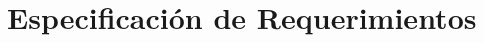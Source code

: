 \documentclass[a4paper]{report}
\begin{document}
\sffamily




\tableofcontents
\listoffigures
\listoftables
\pagebreak

\chapter{Especificación de Requerimientos}

\label{chap:espreque}
 
\end{document}
